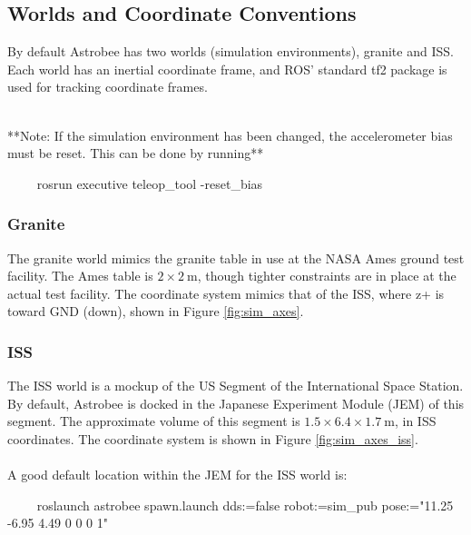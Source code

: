\documentclass{article}
\begin{document}
\subsection{Worlds and Coordinate Conventions}
By default Astrobee has two worlds (simulation environments), granite and ISS. Each world has an inertial coordinate frame, and ROS' standard tf2 package is used for tracking coordinate frames.
\\\\
\begin{markdown}
**Note: If the simulation environment has been changed, the accelerometer bias must be reset. This can be done by running**

~~~~
rosrun executive teleop_tool -reset_bias
~~~~
\end{markdown}


\subsubsection{Granite}
The granite world mimics the granite table in use at the NASA Ames ground test facility. The Ames table is $2 \times 2\ \text{m}$, though tighter constraints are in place at the actual test facility. The coordinate system mimics that of the ISS, where z+ is toward GND (down), shown in Figure \ref{fig:sim_axes}.

\subsubsection{ISS}
The ISS world is a mockup of the US Segment of the International Space Station. By default, Astrobee is docked in the Japanese Experiment Module (JEM) of this segment. The approximate volume of this segment is $1.5 \times 6.4 \times 1.7\ \text{m}$, in ISS coordinates. The coordinate system is shown in Figure \ref{fig:sim_axes_iss}.
\\\\
A good default location within the JEM for the ISS world is:
\begin{markdown}
~~~~
roslaunch astrobee spawn.launch dds:=false
robot:=sim_pub pose:="11.25 -6.95 4.49 0 0 0 1" 
~~~~~
\end{markdown}
\end{document}
